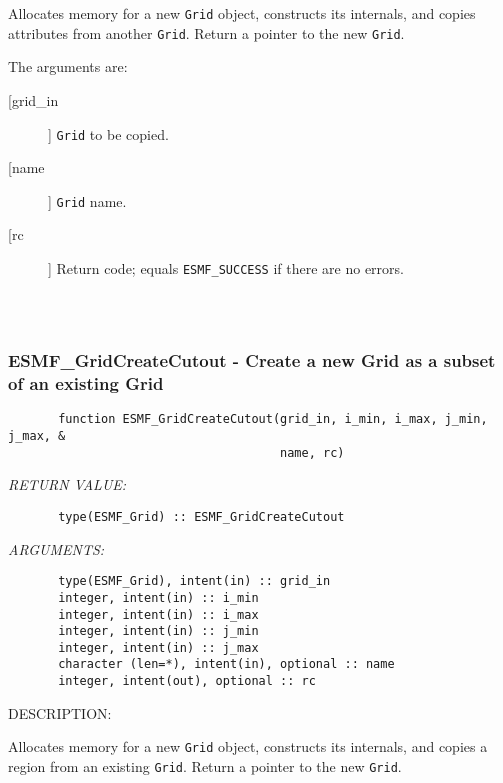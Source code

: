        Allocates memory for a new {\tt Grid} object, constructs its
       internals, and copies attributes from another {\tt Grid}.  Return a
       pointer to the new {\tt Grid}.
  
       The arguments are:
       \begin{description}
       \item[[grid\_in]]
            {\tt Grid} to be copied.
       \item[[name]]
            {\tt Grid} name.
       \item[[rc]]
            Return code; equals {\tt ESMF\_SUCCESS} if there are no errors.
     \end{description}
  
\begin{verbatim} \end{verbatim}
 
 
\mbox{}\hrulefill\ 
 
\subsubsection{ESMF\_GridCreateCutout - Create a new Grid as a subset of an existing Grid}


\begin{verbatim}       function ESMF_GridCreateCutout(grid_in, i_min, i_max, j_min, j_max, &
                                      name, rc)\end{verbatim}{\em RETURN VALUE:}
\begin{verbatim}       type(ESMF_Grid) :: ESMF_GridCreateCutout\end{verbatim}{\em ARGUMENTS:}
\begin{verbatim}       type(ESMF_Grid), intent(in) :: grid_in
       integer, intent(in) :: i_min
       integer, intent(in) :: i_max
       integer, intent(in) :: j_min
       integer, intent(in) :: j_max
       character (len=*), intent(in), optional :: name
       integer, intent(out), optional :: rc\end{verbatim}
{\sf DESCRIPTION:\\ }


       Allocates memory for a new {\tt Grid} object, constructs its
       internals, and copies a region from an existing {\tt Grid}.
       Return a pointer to the new {\tt Grid}.
  
